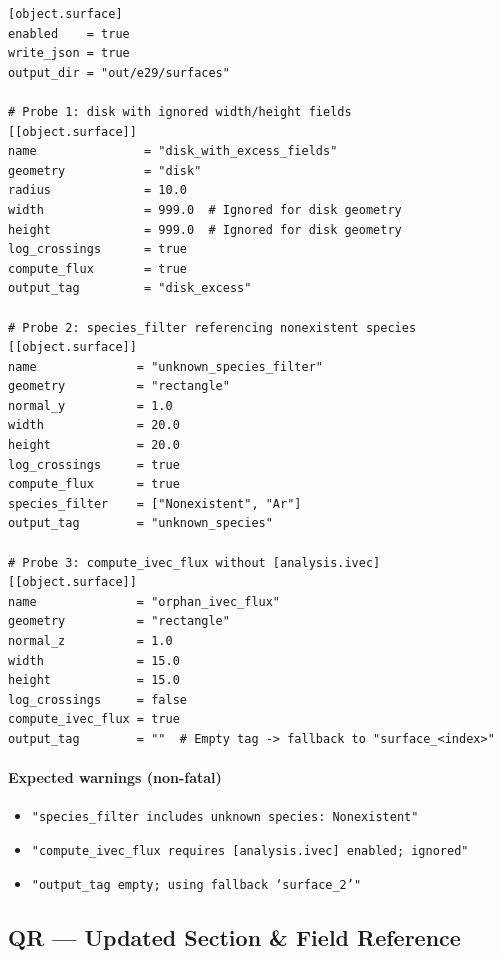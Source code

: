 \documentclass[11pt,a4paper]{article}
\begin{document}
\begin{tcolorbox}[scriptbox, scriptheader,
  title={scripts/e29\_surface\_error\_analysis.vsim (excerpt)}]
\begin{lstlisting}[style=vsimlst]
[object.surface]
enabled    = true
write_json = true
output_dir = "out/e29/surfaces"

# Probe 1: disk with ignored width/height fields
[[object.surface]]
name               = "disk_with_excess_fields"
geometry           = "disk"
radius             = 10.0
width              = 999.0  # Ignored for disk geometry
height             = 999.0  # Ignored for disk geometry
log_crossings      = true
compute_flux       = true
output_tag         = "disk_excess"

# Probe 2: species_filter referencing nonexistent species
[[object.surface]]
name              = "unknown_species_filter"
geometry          = "rectangle"
normal_y          = 1.0
width             = 20.0
height            = 20.0
log_crossings     = true
compute_flux      = true
species_filter    = ["Nonexistent", "Ar"]
output_tag        = "unknown_species"

# Probe 3: compute_ivec_flux without [analysis.ivec]
[[object.surface]]
name              = "orphan_ivec_flux"
geometry          = "rectangle"
normal_z          = 1.0
width             = 15.0
height            = 15.0
log_crossings     = false
compute_ivec_flux = true
output_tag        = ""  # Empty tag -> fallback to "surface_<index>"
\end{lstlisting}
\end{tcolorbox}

\paragraph{Expected warnings (non-fatal)}

\begin{itemize}[leftmargin=1em,itemsep=0pt]
\item \texttt{"species\_filter includes unknown species: Nonexistent"}
\item \texttt{"compute\_ivec\_flux requires [analysis.ivec] enabled; ignored"}
\item \texttt{"output\_tag empty; using fallback `surface\_2'"}
\end{itemize}

\newpage
\subsection*{QR --- Updated Section \& Field Reference}
\end{document}
